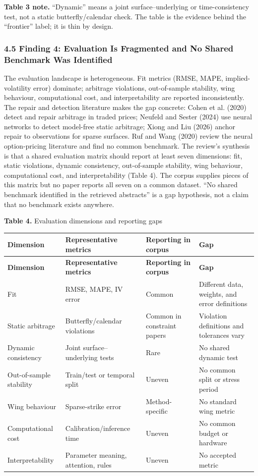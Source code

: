\documentclass[11pt]{article}
\begin{document}
\textbf{Table 3 note.} “Dynamic” means a joint surface–underlying or time-consistency test, not a static butterfly/calendar check. The table is the evidence behind the “frontier” label; it is thin by design.

\subsubsection*{4.5 Finding 4: Evaluation Is Fragmented and No Shared Benchmark Was Identified}
The evaluation landscape is heterogeneous. Fit metrics (RMSE, MAPE, implied-volatility error) dominate; arbitrage violations, out-of-sample stability, wing behaviour, computational cost, and interpretability are reported inconsistently. The repair and detection literature makes the gap concrete: Cohen et al. (2020) detect and repair arbitrage in traded prices; Neufeld and Sester (2024) use neural networks to detect model-free static arbitrage; Xiong and Liu (2026) anchor repair to observations for sparse surfaces. Ruf and Wang (2020) review the neural option-pricing literature and find no common benchmark. The review’s synthesis is that a shared evaluation matrix should report at least seven dimensions: fit, static violations, dynamic consistency, out-of-sample stability, wing behaviour, computational cost, and interpretability (Table 4). The corpus supplies pieces of this matrix but no paper reports all seven on a common dataset. “No shared benchmark identified in the retrieved abstracts” is a gap hypothesis, not a claim that no benchmark exists anywhere.

\textbf{Table 4.} Evaluation dimensions and reporting gaps

\begingroup
\begin{longtable}{@{}p{}p{}p{}p{}@{}}
\toprule
\textbf{Dimension} & \textbf{Representative metrics} & \textbf{Reporting in corpus} & \textbf{Gap} \\
\midrule
\endfirsthead
\toprule
\textbf{Dimension} & \textbf{Representative metrics} & \textbf{Reporting in corpus} & \textbf{Gap} \\
\midrule
\endhead
Fit & RMSE, MAPE, IV error & Common & Different data, weights, and error definitions \\
Static arbitrage & Butterfly/calendar violations & Common in constraint papers & Violation definitions and tolerances vary \\
Dynamic consistency & Joint surface–underlying tests & Rare & No shared dynamic test \\
Out-of-sample stability & Train/test or temporal split & Uneven & No common split or stress period \\
Wing behaviour & Sparse-strike error & Method-specific & No standard wing metric \\
Computational cost & Calibration/inference time & Uneven & No common budget or hardware \\
Interpretability & Parameter meaning, attention, rules & Uneven & No accepted metric \\
\bottomrule
\end{longtable}
\endgroup
\end{document}
